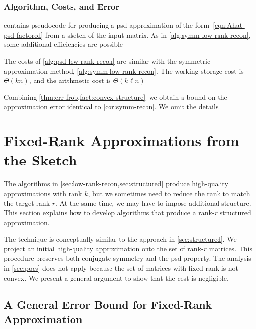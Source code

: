 \documentclass[final]{siamart1116}
\numberwithin{equation}{section}
\numberwithin{theorem}{section}
\numberwithin{figure}{section}
\begin{document}
\subsubsection{Algorithm, Costs, and Error}

 contains pseudocode for producing
a psd approximation of the form~\cref{eqn:Ahat-psd-factored}
from a sketch of the input matrix.
As in \cref{alg:symm-low-rank-recon}, some additional efficiencies are possible

The costs of \cref{alg:psd-low-rank-recon}
are similar with the symmetric approximation method, \cref{alg:symm-low-rank-recon}.
The working storage cost is $\Theta(kn)$,
and the arithmetic cost is $\Theta(k \ell n)$.




Combining \cref{thm:err-frob,fact:convex-structure},
we obtain a bound on the approximation error identical to
\cref{cor:symm-recon}.  We omit the details.



\section{Fixed-Rank Approximations from the Sketch}
\label{sec:fixed-rank}

The algorithms in \cref{sec:low-rank-recon,sec:structured}
produce high-quality approximations with rank $k$, but
we sometimes need to reduce the rank to match the target rank $r$.
At the same time, we may have to impose additional structure.
This section explains how to develop algorithms that produce
a rank-$r$ structured approximation.

The technique is conceptually similar to the approach in \cref{sec:structured}.
We project an initial high-quality approximation onto the set of rank-$r$
matrices.  This procedure preserves both conjugate symmetry and the psd property.
The analysis in \cref{sec:pocs} does not apply because
the set of matrices with fixed rank is not convex.
We present a general argument to show that the
cost is negligible.


















\subsection{A General Error Bound for Fixed-Rank Approximation}
\end{document}
